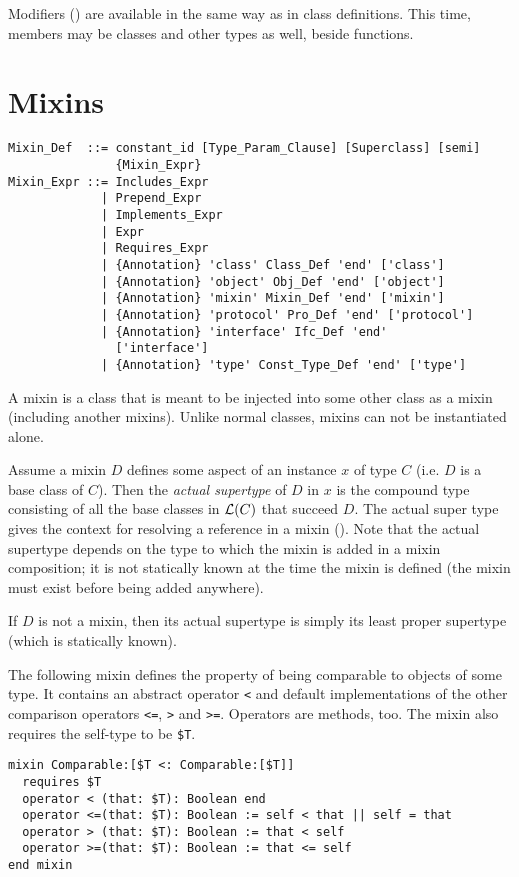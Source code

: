 Modifiers () are available in the same way as in class definitions. This time, members may be classes and other types as well, beside functions. 

\section{Mixins}
\label{sec:mixins}

\syntax\begin{lstlisting}
Mixin_Def  ::= constant_id [Type_Param_Clause] [Superclass] [semi] 
               {Mixin_Expr}
Mixin_Expr ::= Includes_Expr
             | Prepend_Expr
             | Implements_Expr
             | Expr
             | Requires_Expr
             | {Annotation} 'class' Class_Def 'end' ['class']
             | {Annotation} 'object' Obj_Def 'end' ['object']
             | {Annotation} 'mixin' Mixin_Def 'end' ['mixin']
             | {Annotation} 'protocol' Pro_Def 'end' ['protocol']
             | {Annotation} 'interface' Ifc_Def 'end' 
               ['interface']
             | {Annotation} 'type' Const_Type_Def 'end' ['type']
\end{lstlisting}

A mixin is a class that is meant to be injected into some other class as a mixin (including another mixins). Unlike normal classes, mixins can not be instantiated alone. 

Assume a mixin $D$ defines some aspect of an instance $x$ of type $C$ (i.e. $D$ is a base class of $C$). Then the {\em actual supertype} of $D$ in $x$ is the compound type consisting of all the base classes in ${\cal L}(C)$ that succeed $D$. The actual super type gives the context for resolving a  reference in a mixin (). Note that the actual supertype depends on the type to which the mixin is added in a mixin composition; it is not statically known at the time the mixin is defined (the mixin must exist before being added anywhere). 

If $D$ is not a mixin, then its actual supertype is simply its least proper supertype (which is statically known). 

\example The following mixin defines the property of being comparable to objects of some type. It contains an abstract operator \lstinline!<! and default implementations of the other comparison operators \lstinline!<=!, \lstinline!>! and \lstinline!>=!. Operators are methods, too. The mixin also requires the self-type to be \lstinline[mathescape=false]!$T!. 
\begin{lstlisting}[mathescape=false]
mixin Comparable:[$T <: Comparable:[$T]]
  requires $T
  operator < (that: $T): Boolean end
  operator <=(that: $T): Boolean := self < that || self = that
  operator > (that: $T): Boolean := that < self
  operator >=(that: $T): Boolean := that <= self
end mixin
\end{lstlisting}

